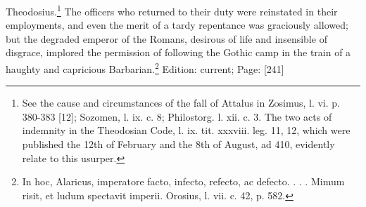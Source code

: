 Theodosius.\footnote{See the cause and circumstances of the fall of Attalus in Zosimus, l. vi. p. 380-383 [12]; Sozomen, l. ix. c. 8; Philostorg. l. xii. c. 3. The two acts of indemnity in the Theodosian Code, l. ix. tit. xxxviii. leg. 11, 12, which were published the 12th of February and the 8th of August, ad 410, evidently relate to this usurper.} The officers who returned to their duty were reinstated in their employments, and even the merit of a tardy repentance was graciously allowed; but the degraded emperor of the Romans, desirous of life and insensible of disgrace, implored the permission of following the Gothic camp in the train of a haughty and capricious Barbarian.\footnote{In hoc, Alaricus, imperatore facto, infecto, refecto, ac defecto. . . . Mimum risit, et ludum spectavit imperii. Orosius, l. vii. c. 42, p. 582.}
Edition: current; Page: [241]

